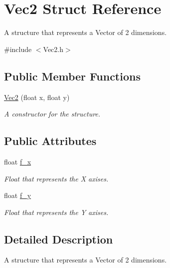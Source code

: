 \hypertarget{struct_vec2}{\section{Vec2 Struct Reference}
\label{struct_vec2}
}


A structure that represents a Vector of 2 dimensions.  




{\ttfamily \#include $<$Vec2.\+h$>$}

\subsection*{Public Member Functions}
\begin{DoxyCompactItemize}
\item 
\hyperlink{struct_vec2_a6256fecebf5a43b14d5d5341c58cfdc4}{Vec2} (float x, float y)
\begin{DoxyCompactList}\small\item\em A constructor for the structure. \end{DoxyCompactList}\end{DoxyCompactItemize}
\subsection*{Public Attributes}
\begin{DoxyCompactItemize}
\item 
\hypertarget{struct_vec2_aacf790ce896c6730590b56a307a554c3}{float \hyperlink{struct_vec2_aacf790ce896c6730590b56a307a554c3}{f\+\_\+x}}\label{struct_vec2_aacf790ce896c6730590b56a307a554c3}

\begin{DoxyCompactList}\small\item\em Float that represents the X axises. \end{DoxyCompactList}\item 
\hypertarget{struct_vec2_ad4eb6792a7c62c9faed59702b60fe87a}{float \hyperlink{struct_vec2_ad4eb6792a7c62c9faed59702b60fe87a}{f\+\_\+y}}\label{struct_vec2_ad4eb6792a7c62c9faed59702b60fe87a}

\begin{DoxyCompactList}\small\item\em Float that represents the Y axises. \end{DoxyCompactList}\end{DoxyCompactItemize}


\subsection{Detailed Description}
A structure that represents a Vector of 2 dimensions. 

